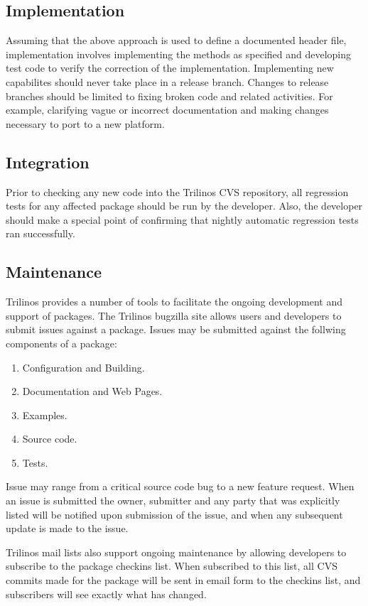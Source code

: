 \documentclass[12pt,relax]{TrilinosDevGuide}
\begin{document}
\subsection{Implementation}
Assuming that the above approach is used to define a documented header
file, implementation involves implementing the methods as specified
and developing test code to verify the correction of the implementation.
Implementing new capabilites should never take place in a release branch.  
Changes to release branches should be limited to fixing broken code and 
related activities.  For example, clarifying vague or incorrect documentation 
and making changes necessary to port to a new platform.

\subsection{Integration}
Prior to checking any new code into the Trilinos CVS repository, all
regression tests for any affected package should be run by the
developer.  Also, the developer should make a special point of
confirming that nightly automatic regression tests ran successfully.


\subsection{Maintenance}
Trilinos provides a number of tools to facilitate the ongoing
development and support of packages.  The Trilinos bugzilla site
allows users and developers to submit issues against a package.
Issues may be submitted against the follwing components of a package:
\begin{enumerate}
\item Configuration and Building.
\item Documentation and Web Pages.
\item Examples.
\item Source code.
\item Tests.
\end{enumerate}
Issue may range from a critical source code bug to a new feature
request.  When an issue is submitted the owner, submitter and any
party that was explicitly listed will be notified upon submission of
the issue, and when any subsequent update is made to the issue.

Trilinos mail lists also support ongoing maintenance by allowing
developers to subscribe to the package checkins list.  When subscribed
to this list, all CVS commits made for the package will be sent in
email form to the checkins list, and subscribers will see exactly what
has changed.
\end{document}
